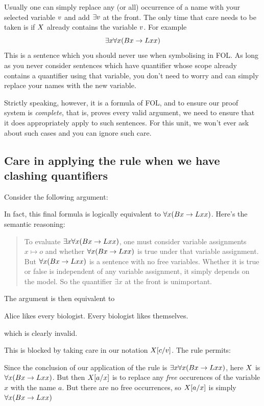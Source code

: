 Usually one can simply replace any (or all) occurrence of a name with your selected variable $v$ and add $\exists v$ at the front. 
The only time that care needs to be taken is if $X$ already contains the variable $v$. For example $$\exists x\forall x(Bx\rightarrow Lxx)$$
This is a sentence which you should never use when symbolising in FOL. As long as you never consider sentences which have quantifier whose scope already contains a quantifier using that variable, you don't need to worry and can simply replace your names with the new variable. 

Strictly speaking, however, it is a formula of FOL, and to ensure our proof system is \emph{complete}, that is, proves every valid argument, we need to ensure that it does appropriately apply to such sentences. For this unit, we won't ever ask about such cases and you can ignore such care. 

\subsection*{Care in applying the rule when we have clashing quantifiers}
Consider the following argument: 
\begin{fitchproof}
\end{fitchproof}
In fact, this final formula is logically equivalent to $\forall x(Bx\rightarrow Lxx)$. Here's the semantic reasoning:
\begin{quote}
	To evaluate $\exists x\forall x(Bx\rightarrow Lxx)$, one must consider variable assignments $x\mapsto o$ and whether 
	$\forall x(Bx\rightarrow Lxx)$ is true under that variable assignment. But $\forall x(Bx\rightarrow Lxx)$ is a sentence with no free variables. Whether it is true or false is independent of any variable assignment, it simply depends on the model. So the quantifier $\exists x$ at the front is unimportant. 
\end{quote}

The argument is then equivalent to \begin{earg}
	\prem Alice likes every biologist.
	\conc Every biologist likes themselves. 	
	\end{earg}
	which is clearly invalid. 
	
This is blocked by taking care in our notation $X[c/v]$. 
The rule permits: 
	\begin{fitchproof}
	 
\end{fitchproof}
Since the conclusion of our application of the rule is $\exists x\forall x(Bx\rightarrow Lxx)$, here $X$ is $\forall x(Bx\rightarrow Lxx)$. But then $X[a/x]$ is to replace any \emph{free} occurences of the variable $x$ with the name $a$. But there are no free occurrences, so  $X[a/x]$ is simply $\forall x(Bx\rightarrow Lxx)$



